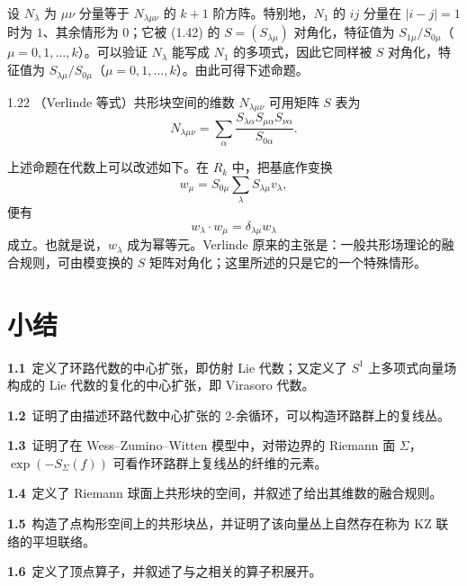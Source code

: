 设 $N_\lambda$ 为 $\mu\nu$ 分量等于 $N_{\lambda\mu\nu}$ 的 $k+1$ 阶方阵。特别地，$N_1$ 的 $ij$ 分量在 $|i-j|=1$ 时为 $1$、其余情形为 $0$；它被 (1.42) 的 $S=(S_{\lambda\mu})$ 对角化，特征值为 $S_{1\mu}/S_{0\mu}$（$\mu=0,1,\dots,k$）。可以验证 $N_\lambda$ 能写成 $N_1$ 的多项式，因此它同样被 $S$ 对角化，特征值为 $S_{\lambda\mu}/S_{0\mu}$（$\mu=0,1,\dots,k$）。由此可得下述命题。

\begin{proposition}{1.22}
  （Verlinde 等式）共形块空间的维数 $N_{\lambda\mu\nu}$ 可用矩阵 $S$ 表为
  \[
  N_{\lambda\mu\nu}=\sum_{\alpha}\frac{S_{\lambda\alpha}S_{\mu\alpha}S_{\nu\alpha}}{S_{0\alpha}} .
  \]
\end{proposition}


上述命题在代数上可以改述如下。在 $R_k$ 中，把基底作变换
\[
w_\mu=S_{0\mu}\sum_{\lambda}S_{\lambda\mu}v_\lambda ,
\]
便有
\[
w_\lambda\cdot w_\mu=\delta_{\lambda\mu}w_\lambda
\]
成立。也就是说，$w_\lambda$ 成为幂等元。Verlinde 原来的主张是：一般共形场理论的融合规则，可由模变换的 $S$ 矩阵对角化；这里所述的只是它的一个特殊情形。


\section*{小结}

\textbf{1.1}\ 定义了环路代数的中心扩张，即仿射 Lie 代数；又定义了 $S^1$ 上多项式向量场构成的 Lie 代数的复化的中心扩张，即 Virasoro 代数。

\textbf{1.2}\ 证明了由描述环路代数中心扩张的 2-余循环，可以构造环路群上的复线丛。

\textbf{1.3}\ 证明了在 Wess--Zumino--Witten 模型中，对带边界的 Riemann 面 $\Sigma$，$\exp(-S_\Sigma(f))$ 可看作环路群上复线丛的纤维的元素。

\textbf{1.4}\ 定义了 Riemann 球面上共形块的空间，并叙述了给出其维数的融合规则。

\textbf{1.5}\ 构造了点构形空间上的共形块丛，并证明了该向量丛上自然存在称为 KZ 联络的平坦联络。

\textbf{1.6}\ 定义了顶点算子，并叙述了与之相关的算子积展开。

